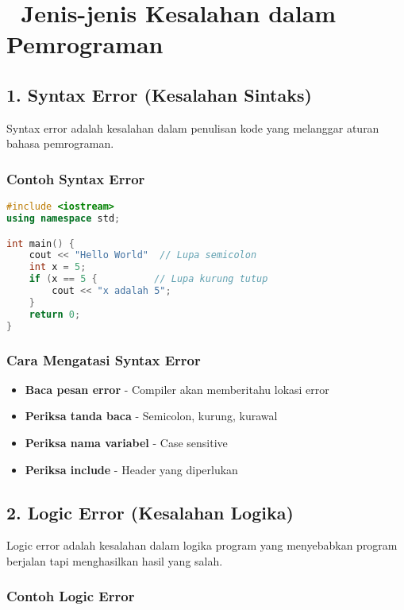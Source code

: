 \section{🚨 Jenis-jenis Kesalahan dalam Pemrograman}

\subsection{1. Syntax Error (Kesalahan Sintaks)}

Syntax error adalah kesalahan dalam penulisan kode yang melanggar aturan bahasa pemrograman.

\subsubsection{Contoh Syntax Error}

\begin{lstlisting}[language=c++, caption=Contoh Syntax Error]
#include <iostream>
using namespace std;

int main() {
    cout << "Hello World"  // Lupa semicolon
    int x = 5;
    if (x == 5 {          // Lupa kurung tutup
        cout << "x adalah 5";
    }
    return 0;
}
\end{lstlisting}

\subsubsection{Cara Mengatasi Syntax Error}

\begin{itemize}
\item \textbf{Baca pesan error} - Compiler akan memberitahu lokasi error
\item \textbf{Periksa tanda baca} - Semicolon, kurung, kurawal
\item \textbf{Periksa nama variabel} - Case sensitive
\item \textbf{Periksa include} - Header yang diperlukan
\end{itemize}

\subsection{2. Logic Error (Kesalahan Logika)}

Logic error adalah kesalahan dalam logika program yang menyebabkan program berjalan tapi menghasilkan hasil yang salah.

\subsubsection{Contoh Logic Error}

